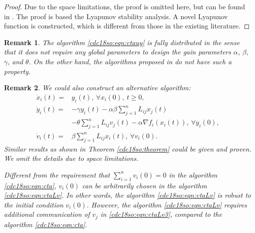 \documentclass[letterpaper, 10 pt, conference]{ieeeconf}  %
\newtheorem{remark}{Remark}
\begin{document}
\begin{proof}
Due to the  space limitations, the proof is omitted here, but can be found in \cite{yi2018distributedopti}.
The proof is based the Lyapunov stability analysis. A novel Lyapunov function is constructed, which is different from those in the existing literature.
\end{proof}

\begin{remark}
The algorithm \eqref{cdc18so:eqn:ctauy} is fully distributed in the sense that it does not require any global parameters to design the gain parameters $\alpha$, $\beta$, $\gamma$, and $\theta$. On the other hand, the algorithms proposed in \cite{zhang2014distributed,yu2016gradient} do not have such a property.
\end{remark}

\begin{remark} We could also construct an alternative algorithm:
\begin{subequations}\label{cdc18so:eqn:ctaLv}
\begin{align}
    \dot{x}_i(t) =&y_i(t),~\forall x_i(0),~t\ge0,\label{cdc18so:eqn:ctaLv2}\\
  \dot{y}_i(t) = & - \gamma y_i(t)-\alpha\beta \sum_{j=1}^nL_{ij}x_j(t)\nonumber\\
  &  - \theta \sum_{j=1}^nL_{ij}v_j(t)- \alpha \nabla f_i(x_i(t)),~\forall y_i(0),\label{cdc18so:eqn:ctaLv3}\\
    \dot{v}_i(t) = &\beta\sum_{j=1}^nL_{ij}x_i(t),~\forall v_i(0).\label{cdc18so:eqn:ctaLv1}
\end{align}
\end{subequations}
Similar results as shown in Theorem \ref{cdc18so:theorem} could be given and proven. We omit the details due to space limitations. %

Different from the requirement that $\sum_{i=1}^nv_i(0)=0$ in the algorithm \eqref{cdc18so:eqn:cta}, $v_i(0)$ can be arbitrarily chosen in the algorithm  \eqref{cdc18so:eqn:ctaLv}. In other words, the algorithm  \eqref{cdc18so:eqn:ctaLv} is robust to the initial condition $v_i(0)$. However, the algorithm  \eqref{cdc18so:eqn:ctaLv} requires additional communication of $v_j$ in \eqref{cdc18so:eqn:ctaLv3}, compared to the algorithm \eqref{cdc18so:eqn:cta}.
\end{remark}
\end{document}
